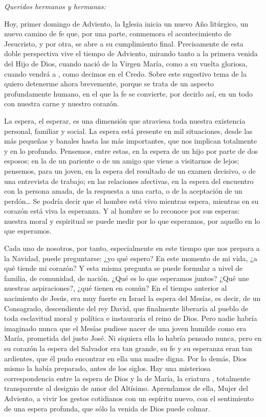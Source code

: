 			\begin{body}
				\emph{Queridos hermanos y hermanas:} 
				
				Hoy, primer domingo de Adviento, la Iglesia inicia un nuevo Año litúrgico, un nuevo camino de fe que, por una parte, conmemora el acontecimiento de Jesucristo, y por otra, se abre a su cumplimiento final. Precisamente de esta doble perspectiva vive el tiempo de Adviento, mirando tanto a la primera venida del Hijo de Dios, cuando nació de la Virgen María, como a su vuelta gloriosa, cuando vendrá a , como decimos en el Credo. Sobre este sugestivo tema de la  quiero detenerme ahora brevemente, porque se trata de un aspecto profundamente humano, en el que la fe se convierte, por decirlo así, en un todo con nuestra carne y nuestro corazón. 
				
				La espera, el esperar, es una dimensión que atraviesa toda nuestra existencia personal, familiar y social. La espera está presente en mil situaciones, desde las más pequeñas y banales hasta las más importantes, que nos implican totalmente y en lo profundo. Pensemos, entre estas, en la espera de un hijo por parte de dos esposos; en la de un pariente o de un amigo que viene a visitarnos de lejos; pensemos, para un joven, en la espera del resultado de un examen decisivo, o de una entrevista de trabajo; en las relaciones afectivas, en la espera del encuentro con la persona amada, de la respuesta a una carta, o de la aceptación de un perdón\ldots{} Se podría decir que el hombre está vivo mientras espera, mientras en su corazón está viva la esperanza. Y al hombre se lo reconoce por sus esperas: nuestra  moral y espiritual se puede medir por lo que esperamos, por aquello en lo que esperamos. 
				
				Cada uno de nosotros, por tanto, especialmente en este tiempo que nos prepara a la Navidad, puede preguntarse: ¿yo qué espero? En este momento de mi vida, ¿a qué tiende mi corazón? Y esta misma pregunta se puede formular a nivel de familia, de comunidad, de nación. ¿Qué es lo que esperamos juntos? ¿Qué une nuestras aspiraciones?, ¿qué tienen en común? En el tiempo anterior al nacimiento de Jesús, era muy fuerte en Israel la espera del Mesías, es decir, de un Consagrado, descendiente del rey David, que finalmente liberaría al pueblo de toda esclavitud moral y política e instauraría el reino de Dios. Pero nadie habría imaginado nunca que el Mesías pudiese nacer de una joven humilde como era María, prometida del justo José. Ni siquiera ella lo habría pensado nunca, pero en su corazón la espera del Salvador era tan grande, su fe y su esperanza eran tan ardientes, que él pudo encontrar en ella una madre digna. Por lo demás, Dios mismo la había preparado, antes de los siglos. Hay una misteriosa correspondencia entre la espera de Dios y la de María, la criatura , totalmente transparente al designio de amor del Altísimo. Aprendamos de ella, Mujer del Adviento, a vivir los gestos cotidianos con un espíritu nuevo, con el sentimiento de una espera profunda, que sólo la venida de Dios puede colmar.
			\end{body}	
		
